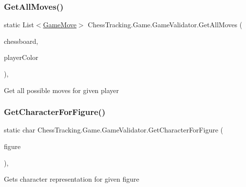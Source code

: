 \subsubsection{\texorpdfstring{GetAllMoves()}{GetAllMoves()}}
{\footnotesize\ttfamily static List$<$\mbox{\hyperlink{class_chess_tracking_1_1_game_1_1_game_move}{Game\+Move}}$>$ Chess\+Tracking.\+Game.\+Game\+Validator.\+Get\+All\+Moves (\begin{DoxyParamCaption}\item[{\mbox{\hyperlink{class_chess_tracking_1_1_game_1_1_chessboard_model}{Chessboard\+Model}}}]{chessboard,  }\item[{\mbox{\hyperlink{namespace_chess_tracking_1_1_game_ab79070a55977a8c8326e9cdda7dcfa9a}{Player\+Color}}}]{player\+Color }\end{DoxyParamCaption})\hspace{0.3cm}{\ttfamily [static]}, {\ttfamily [private]}}



Get all possible moves for given player 

\mbox{\label{class_chess_tracking_1_1_game_1_1_game_validator_af281d5b7de0758fd82b6fefc5b0f72a9}} 
\subsubsection{\texorpdfstring{GetCharacterForFigure()}{GetCharacterForFigure()}}
{\footnotesize\ttfamily static char Chess\+Tracking.\+Game.\+Game\+Validator.\+Get\+Character\+For\+Figure (\begin{DoxyParamCaption}\item[{Figure\+Type}]{figure }\end{DoxyParamCaption})\hspace{0.3cm}{\ttfamily [static]}, {\ttfamily [private]}}



Gets character representation for given figure 

\mbox{\label{class_chess_tracking_1_1_game_1_1_game_validator_a9d64f0d4215314e71ded89fa25d1cf8f}} 
